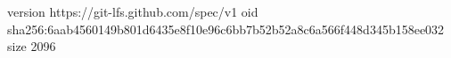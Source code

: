 version https://git-lfs.github.com/spec/v1
oid sha256:6aab4560149b801d6435e8f10e96c6bb7b52b52a8c6a566f448d345b158ee032
size 2096
